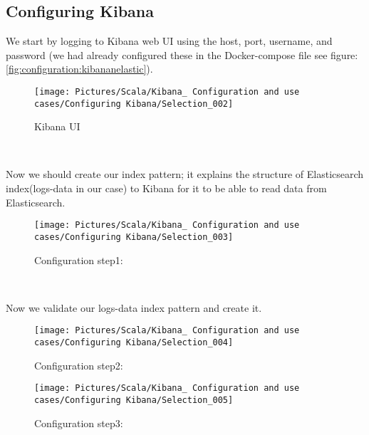 \begin{spacing}{1.2}
\section{Configuring Kibana }
\par We start by logging to Kibana web UI using the host, port, username, and password (we had already configured these in the Docker-compose file see figure: \ref{fig:configuration:kibananelastic}). 
\\
\begin{figure}[!htb] 
\begin{center} 
\texttt{[image: Pictures/Scala/Kibana\_ Configuration and use cases/Configuring Kibana/Selection\_002]} 
\end{center} 
\caption{Kibana UI} 
\end{figure}  \FloatBarrier
\\
\newpage
\par  Now we should create our index pattern; it explains the structure of Elasticsearch index(logs-data in our case) to Kibana for it to be able to read data from Elasticsearch.  
\\
\begin{figure}[!htb] 
\begin{center} 
\texttt{[image: Pictures/Scala/Kibana\_ Configuration and use cases/Configuring Kibana/Selection\_003]} 
\end{center} 
\caption{Configuration step1: } 
\end{figure}  \FloatBarrier
\\

\par Now we validate our logs-data index pattern and create it.
\\
\begin{figure}[!htb] 
\begin{center} 
\texttt{[image: Pictures/Scala/Kibana\_ Configuration and use cases/Configuring Kibana/Selection\_004]} 
\end{center} 
\caption{Configuration step2: } 
\end{figure}  \FloatBarrier

\begin{figure}[!htb] 
\begin{center} 
\texttt{[image: Pictures/Scala/Kibana\_ Configuration and use cases/Configuring Kibana/Selection\_005]} 
\end{center} 
\caption{Configuration step3: } 
\end{figure}  \FloatBarrier


\end{spacing}
